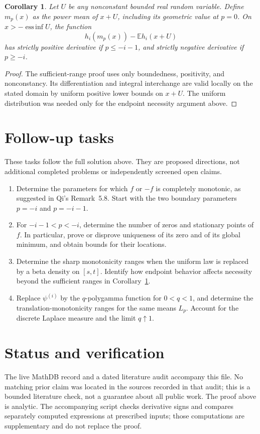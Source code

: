 \documentclass[11pt]{article}
\newtheorem{corollary}{Corollary}
\newcommand{\E}{\mathbb E}
\begin{document}
\begin{corollary}\label{cor:weighted}
Let $U$ be any nonconstant bounded real random variable. Define
$m_p(x)$ as the power mean of $x+U$, including its geometric value
at $p=0$. On $x>-\operatorname*{ess\,inf}U$, the function
\[
h_i(m_p(x))-\E h_i(x+U)
\]
has strictly positive derivative if $p\le-i-1$, and strictly negative
derivative if $p\ge-i$.
\end{corollary}
\begin{proof}
The sufficient-range proof uses only boundedness, positivity, and
nonconstancy. Its differentiation and integral interchange are valid
locally on the stated domain by uniform positive lower bounds on $x+U$.
The uniform distribution was needed only for the endpoint necessity
argument above.
\end{proof}

\section*{Follow-up tasks}
These tasks follow the full solution above. They are proposed directions,
not additional completed problems or independently screened open claims.
\begin{enumerate}[label=\textbf{Task \arabic*:},start=2,leftmargin=*]
\item Determine the parameters for which $f$ or $-f$ is completely
monotonic, as suggested in Qi's Remark~5.8. Start with the two boundary
parameters $p=-i$ and $p=-i-1$.
\item For $-i-1<p<-i$, determine the number of zeros and stationary
points of $f$. In particular, prove or disprove uniqueness of its zero
and of its global minimum, and obtain bounds for their locations.
\item Determine the sharp monotonicity ranges when the uniform law is
replaced by a beta density on $[s,t]$. Identify how endpoint behavior
affects necessity beyond the sufficient ranges in
Corollary~\ref{cor:weighted}.
\item Replace $\psi^{(i)}$ by the $q$-polygamma function for $0<q<1$,
and determine the translation-monotonicity ranges for the same means
$L_p$. Account for the discrete Laplace measure and the limit $q\uparrow1$.
\end{enumerate}

\section*{Status and verification}
The live MathDB record and a dated literature audit accompany this file.
No matching prior claim was located in the sources recorded in that audit;
this is a bounded literature check, not a guarantee about all public work.
The proof above is analytic. The accompanying script checks derivative
signs and compares separately computed expressions at prescribed inputs;
those computations are supplementary and do not replace the proof.
\end{document}
